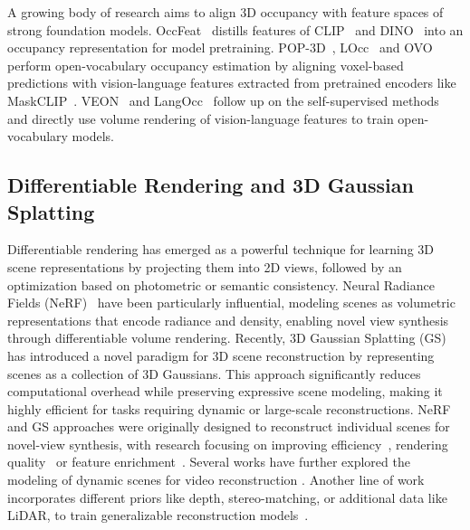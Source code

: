 \documentclass[10pt,twocolumn,letterpaper]{article}
\begin{document}
A growing body of research aims to align 3D occupancy with feature spaces of strong foundation models.
OccFeat~\cite{sirko2024occfeat} distills features of CLIP~\cite{radford2021learning} and DINO~\cite{caron2021emerging, oquab2023dinov2} into an occupancy representation for model pretraining.
POP-3D~\cite{vobecky2024pop}, LOcc~\cite{yu2024language} and OVO~\cite{tan2023ovo} perform open-vocabulary occupancy estimation by aligning voxel-based predictions with vision-language features extracted from pretrained encoders like MaskCLIP~\cite{zhou2022extract}.
VEON~\cite{zheng2025veon} and LangOcc~\cite{boeder2024langocc} follow up on the self-supervised methods and directly use volume rendering of vision-language features to train open-vocabulary models.

\subsection{Differentiable Rendering and 3D Gaussian Splatting}
Differentiable rendering has emerged as a powerful technique for learning 3D scene representations by projecting them into 2D views, followed by an optimization based on photometric or semantic consistency.
Neural Radiance Fields (NeRF)~\cite{mildenhall2021nerf} have been particularly influential, modeling scenes as volumetric representations that encode radiance and density, enabling novel view synthesis through differentiable volume rendering.
Recently, 3D Gaussian Splatting (GS)~\cite{kerbl20233d} has introduced a novel paradigm for 3D scene reconstruction by representing scenes as a collection of 3D Gaussians.
This approach significantly reduces computational overhead while preserving expressive scene modeling, making it highly efficient for tasks requiring dynamic or large-scale reconstructions.
NeRF and GS approaches were originally designed to reconstruct individual scenes for novel-view synthesis, with research focusing on improving efficiency~\cite{muller2022instant, chen2025mvsplat}, rendering quality~\cite{barron2021mip, barron2022mip} or feature enrichment~\cite{qin2024langsplat, kerr2023lerf, ye2023featurenerf, zhou2024feature}.
Several works have further explored the modeling of dynamic scenes for video reconstruction \cite{wu20244d, fridovich2023k, pumarola2021d}.
Another line of work incorporates different priors like depth, stereo-matching, or additional data like LiDAR, to train generalizable reconstruction models~\cite{xu2022point,chang2022rc,chen2021mvsnerf,yu2021pixelnerf, wimbauer2023behind, liu2025mvsgaussian, zheng2024gps}.
\end{document}
